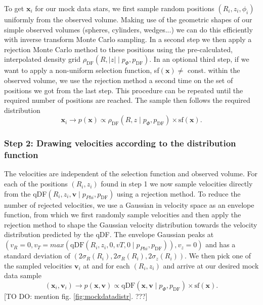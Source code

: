 \documentclass[12pt,preprint]{aastex}
\newcommand{\vect}[1]{\boldsymbol{#1}} %
\begin{document}
To get $\vect{x}_i$ for our mock data stars, we first sample random positions $(R_i,z_i,\phi_i)$ uniformly from the observed volume. Making use of the geometric shapes of our simple observed volumes (spheres, cylinders, wedges...) we can do this efficiently with inverse transform Monte Carlo sampling. In a second step we then apply a rejection Monte Carlo method to these positions using the pre-calculated, interpolated density grid $\rho_\text{DF}(R,|z| \mid p_{\Phi},p_\text{DF})$. In an optional third step, if we want to apply a non-uniform selection function, sf$(\vect{x}) \neq $ const. within the observed volume, we use the rejection method a second time on the set of positions we got from the last step. This procedure can be repeated until the required number of positions are reached. The sample then follows the required distribution
\begin{equation*}
\vect{x}_i \longrightarrow p(\vect{x}) \propto \rho_\text{DF}(R,z \mid p_{\Phi},p_\text{DF}) \times \text{sf}(\vect{x}).
\end{equation*}

\subsubsection{Step 2: Drawing velocities according to the distribution function}

The velocities are independent of the selection function and observed volume. For each of the positions $(R_i,z_i)$ found in step 1 we now sample velocities directly from the qDF$(R_i,z_i,\vect{v} \mid p_{Phi},p_\text{DF})$ using a rejection method. To reduce the number of rejected velocities, we use a Gaussian in velocity space as an envelope function, from which we first randomly sample velocities and then apply the rejection method to shape the Gaussian velocity distribution towards the velocity distribution predicted by the qDF. The envelope Gaussian peaks at $(v_R=0,v_T=max(\text{qDF}(R_i,z_i,0,vT,0 \mid p_{Phi},p_\text{DF})),v_z=0)$ and has a standard deviation of $(2\sigma_R(R_i),2\sigma_R(R_i),2\sigma_z(R_i))$. We then pick one of the sampled velocities $\vect{v}_i$ at and for each $(R_i,z_i)$ and arrive at our desired mock data sample
\begin{equation*}
(\vect{x}_i,\vect{v}_i) \longrightarrow p(\vect{x},\vect{v}) \propto \text{qDF}(\vect{x},\vect{v} \mid p_{\Phi},p_\text{DF}) \times \text{sf}(\vect{x}).
\end{equation*} 
[TO DO: mention fig. \ref{fig:mockdatadistr}. ???]
\end{document}

